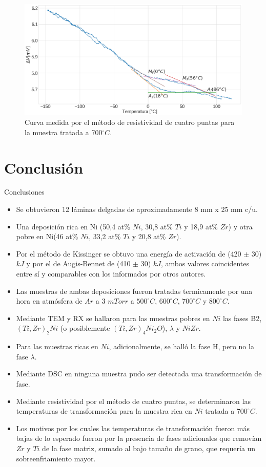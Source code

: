 \documentclass[11pt]{beamer}
\begin{document}
			\begin{frame}
				\begin{figure}[H]
					\centering
					\includegraphics[scale=0.2]{img/Resistance_700.png}
					\caption*{Curva medida por el método de resistividad de cuatro puntas para la muestra tratada a 700$^\circ C$.}
				\end{figure}
			\end{frame}
	

\section{Conclusión}
	\begin{frame}[allowframebreaks]{Conclusiones}
		\begin{itemize}
			\item Se obtuvieron 12 láminas delgadas de aproximadamente 8 mm x 25 mm c/u.
			\item Una deposición rica en Ni (50,4 at\% $Ni$, 30,8 at\% $Ti$ y 18,9 at\% $Zr$) y otra pobre en Ni(46 at\% $Ni$, 33,2 at\% $Ti$ y 20,8 at\% $Zr$).
			\item Por el método de Kissinger se obtuvo una energía de activación de (420 $\pm$ 30) $kJ$ y por el de Augis-Bennet de (410 $\pm$ 30) $kJ$, ambos valores coincidentes entre sí y comparables con los informados por otros autores.
			\item Las muestras de ambas deposiciones fueron tratadas termicamente por una hora en atmósfera de $Ar$ a 3 $mTorr$ a $500^\circ C$, $600^\circ C$, $700^\circ C$ y $800^\circ C$.
			\item Mediante TEM y RX se hallaron para las muestras pobres en $Ni$ las fases B2, $(Ti, Zr)_2Ni$ (o posiblemente $(Ti, Zr)_4Ni_2O$), $\lambda$ y $NiZr$.
			\item Para las muestras ricas en $Ni$, adicionalmente, se halló la fase H, pero no la fase $\lambda$.
			\item Mediante DSC en ninguna muestra pudo ser detectada una transformación de fase.
			\item Mediante resistividad por el método de cuatro puntas, se determinaron las temperaturas de transformación para la muestra rica en $Ni$ tratada a $700^\circ C$.
			\item Los motivos por los cuales las temperaturas de transformación fueron más bajas de lo esperado fueron por la presencia de fases adicionales que removían $Zr$ y $Ti$ de la fase matriz, sumado al bajo tamaño de grano, que requería un sobreenfriamiento mayor.
		\end{itemize}
	\end{frame}
	
\end{document}
